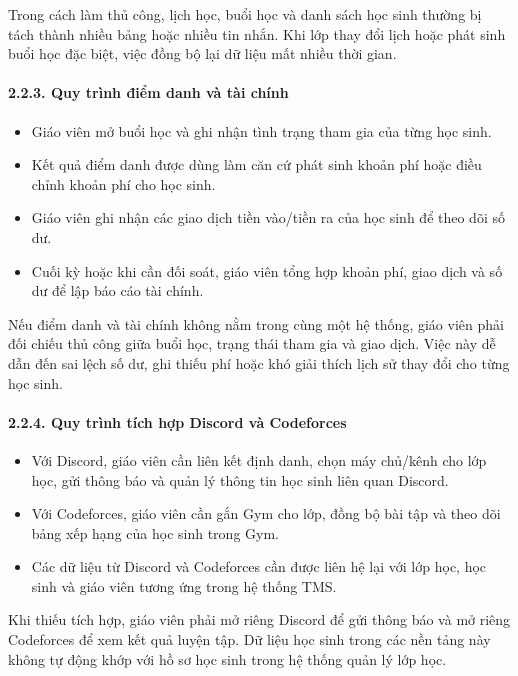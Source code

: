\documentclass[12pt,a4paper]{article}
\begin{document}
Trong cách làm thủ công, lịch học, buổi học và danh sách học sinh thường bị tách
thành nhiều bảng hoặc nhiều tin nhắn. Khi lớp thay đổi lịch hoặc phát sinh buổi
học đặc biệt, việc đồng bộ lại dữ liệu mất nhiều thời gian.

\paragraph{2.2.3. Quy trình điểm danh và tài chính}

\begin{itemize}[leftmargin=*]
    \item Giáo viên mở buổi học và ghi nhận tình trạng tham gia của từng học
    sinh.
    \item Kết quả điểm danh được dùng làm căn cứ phát sinh khoản phí hoặc điều
    chỉnh khoản phí cho học sinh.
    \item Giáo viên ghi nhận các giao dịch tiền vào/tiền ra của học sinh để theo
    dõi số dư.
    \item Cuối kỳ hoặc khi cần đối soát, giáo viên tổng hợp khoản phí, giao dịch
    và số dư để lập báo cáo tài chính.
\end{itemize}

Nếu điểm danh và tài chính không nằm trong cùng một hệ thống, giáo viên phải
đối chiếu thủ công giữa buổi học, trạng thái tham gia và giao dịch. Việc này dễ
dẫn đến sai lệch số dư, ghi thiếu phí hoặc khó giải thích lịch sử thay đổi cho
từng học sinh.

\paragraph{2.2.4. Quy trình tích hợp Discord và Codeforces}

\begin{itemize}[leftmargin=*]
    \item Với Discord, giáo viên cần liên kết định danh, chọn máy chủ/kênh cho
    lớp học, gửi thông báo và quản lý thông tin học sinh liên quan Discord.
    \item Với Codeforces, giáo viên cần gắn Gym cho lớp, đồng bộ bài tập và theo
    dõi bảng xếp hạng của học sinh trong Gym.
    \item Các dữ liệu từ Discord và Codeforces cần được liên hệ lại với lớp học,
    học sinh và giáo viên tương ứng trong hệ thống TMS.
\end{itemize}

Khi thiếu tích hợp, giáo viên phải mở riêng Discord để gửi thông báo và mở riêng
Codeforces để xem kết quả luyện tập. Dữ liệu học sinh trong các nền tảng này
không tự động khớp với hồ sơ học sinh trong hệ thống quản lý lớp học.
\end{document}
